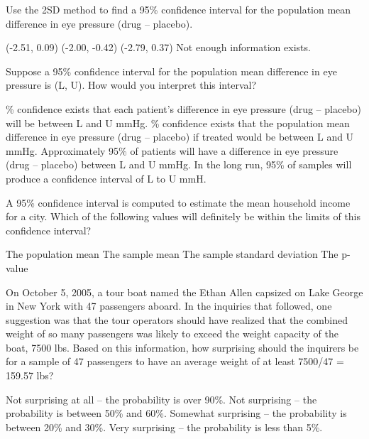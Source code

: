 \documentclass{article}
\begin{document}
	\begin{mcquestions}
		\question Use the 2SD method to find a 95\% confidence interval for the population mean difference in eye pressure (drug – placebo).
		\begin{mcanswerslist}
			\answer  (-2.51, 0.09)
			\answer  (-2.00, -0.42)
			\answer[correct]  (-2.79, 0.37)
			\answer  Not enough information exists.
		\end{mcanswerslist}
		
		\question Suppose a 95\% confidence interval for the population mean difference in eye pressure is (L, U). How would you interpret this interval?
		\begin{mcanswerslist}
			\% confidence exists that each patient's difference in eye pressure (drug – placebo) will be between L and U mmHg.
			\% confidence exists that the population mean difference in eye pressure (drug – placebo) if treated would be between L and U mmHg.
			\answer  Approximately 95\% of patients will have a difference in eye pressure (drug – placebo) between L and U mmHg.
			\answer  In the long run, 95\% of samples will produce a confidence interval of L to U mmH.
		\end{mcanswerslist}
		
		\question A 95\% confidence interval is computed to estimate the mean household income for a city. Which of the following values will definitely be within the limits of this confidence interval?
		\begin{mcanswerslist}
			\answer  The population mean
			\answer[correct]  The sample mean
			\answer  The sample standard deviation
			\answer  The p-value
		\end{mcanswerslist}
		
		\question On October 5, 2005, a tour boat named the Ethan Allen capsized on Lake George in New York with 47 passengers aboard. In the inquiries that followed, one suggestion was that the tour operators should have realized that the combined weight of so many passengers was likely to exceed the weight capacity of the boat, 7500 lbs.
		Based on this information, how surprising should the inquirers be for a sample of 47 passengers to have an average weight of at least 7500/47 = 159.57 lbs?
		\begin{mcanswerslist}
			\answer[correct]  Not surprising at all – the probability is over 90\%.
			\answer  Not surprising – the probability is between 50\% and 60\%.
			\answer  Somewhat surprising – the probability is between 20\% and 30\%.
			\answer  Very surprising – the probability is less than 5\%.
		\end{mcanswerslist}
	\end{mcquestions}
\end{document}
